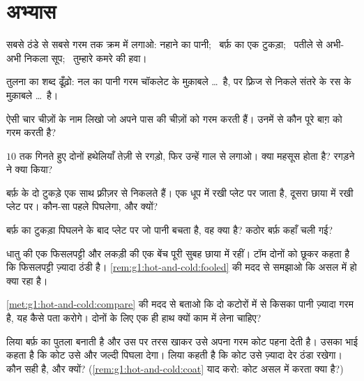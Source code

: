 \section{अभ्यास}

\begin{exercise}[$\star$]\label{exo:g1:hot-and-cold:1}
सबसे ठंडे से सबसे गरम तक क्रम में लगाओ: नहाने का पानी; \ बर्फ़ का एक
टुकड़ा; \ पतीले से अभी-अभी निकला सूप; \ तुम्हारे कमरे की हवा।
\end{exercise}

\begin{exercise}[$\star$]\label{exo:g1:hot-and-cold:2}
तुलना का शब्द ढूँढ़ो: नल का पानी गरम चॉकलेट के मुक़ाबले \dots\ है,
पर फ़्रिज से निकले संतरे के रस के मुक़ाबले \dots\ है।
\end{exercise}

\begin{exercise}[$\star$]\label{exo:g1:hot-and-cold:3}
ऐसी चार चीज़ों के नाम लिखो जो अपने पास की चीज़ों को गरम करती हैं।
उनमें से कौन पूरे बाग़ को गरम करती है?
\end{exercise}

\begin{exercise}[$\star$]\label{exo:g1:hot-and-cold:4}
$10$ तक गिनते हुए दोनों हथेलियाँ तेज़ी से रगड़ो, फिर उन्हें गाल से
लगाओ। क्या महसूस होता है? रगड़ने ने क्या किया?
\end{exercise}

\begin{exercise}[$\star$]\label{exo:g1:hot-and-cold:5}
बर्फ़ के दो टुकड़े एक साथ फ़्रीज़र से निकलते हैं। एक धूप में रखी प्लेट
पर जाता है, दूसरा छाया में रखी प्लेट पर। कौन-सा पहले पिघलेगा, और
क्यों?
\end{exercise}

\begin{exercise}[$\star$]\label{exo:g1:hot-and-cold:6}
बर्फ़ का टुकड़ा पिघलने के बाद प्लेट पर जो पानी बचता है, वह क्या है?
कठोर बर्फ़ कहाँ चली गई?
\end{exercise}

\begin{exercise}[$\star$]\label{exo:g1:hot-and-cold:7}
धातु की एक फिसलपट्टी और लकड़ी की एक बेंच पूरी सुबह छाया में रहीं। टॉम
दोनों को छूकर कहता है कि फिसलपट्टी ज़्यादा ठंडी है।
\cref{rem:g1:hot-and-cold:fooled} की मदद से समझाओ कि असल में हो
क्या रहा है।
\end{exercise}

\begin{exercise}[$\star$]\label{exo:g1:hot-and-cold:8}
\cref{met:g1:hot-and-cold:compare} की मदद से बताओ कि दो कटोरों में
से किसका पानी ज़्यादा गरम है, यह कैसे पता करोगे। दोनों के लिए एक ही
हाथ क्यों काम में लेना चाहिए?
\end{exercise}

\begin{exercise}[$\star\star$]\label{exo:g1:hot-and-cold:9}
लिया बर्फ़ का पुतला बनाती है और उस पर तरस खाकर उसे अपना गरम कोट पहना
देती है। उसका भाई कहता है कि कोट उसे और जल्दी पिघला देगा। लिया कहती
है कि कोट उसे ज़्यादा देर ठंडा रखेगा। कौन सही है, और क्यों?
(\cref{rem:g1:hot-and-cold:coat} याद करो: कोट असल में करता क्या है?)
\end{exercise}
